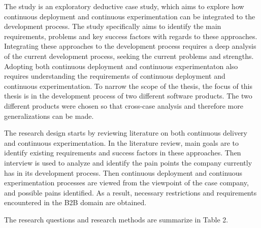 \documentclass[english]{tktltiki2}
\theoremstyle{definition}
\theoremstyle{remark}
\begin{document}
The study is an exploratory deductive case study, which aims to explore how continuous deployment and continuous experimentation can be integrated to the development process. The study specifically aims to identify the main requirements, problems and key success factors with regards to these approaches. Integrating these approaches to the development process requires a deep analysis of the current development process, seeking the current problems and strengths. Adopting both continuous deployment and continuous experimentaton also requires understanding the requirements of continuous deployment and continuous experimentation. To narrow the scope of the thesis, the focus of this thesis is in the development process of two different software products. The two different products were chosen so that cross-case analysis and therefore more generalizations can be made.

The research design starts by reviewing literature on both continuous delivery and continuous experimentation. In the literature review, main goals are to identify existing requirements and success factors in these approaches. Then interview is used to analyze and identify the pain points the company currently has in its development process. Then continuous deployment and continuous experimentation processes are viewed from the viewpoint of the case company, and possible pains identified. As a result, necessary restrictions and requirements encountered in the B2B domain are obtained. 

The research questions and research methods are summarize in Table 2.
\end{document}
